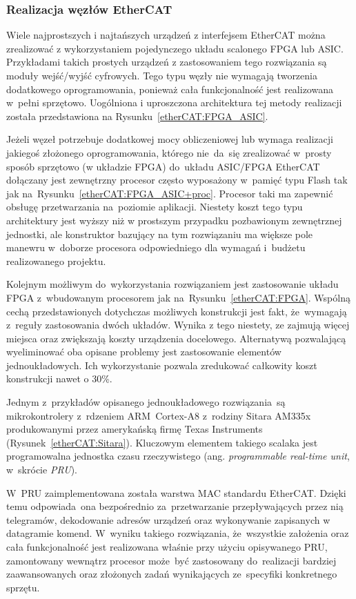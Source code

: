 \subsubsection{Realizacja węzłów EtherCAT}
Wiele najprostszych i najtańszych urządzeń z interfejsem EtherCAT można zrealizować z wykorzystaniem pojedynczego układu scalonego FPGA lub ASIC. Przykładami takich prostych urządzeń z zastosowaniem tego rozwiązania są moduły wejść/wyjść cyfrowych. Tego typu węzły nie wymagają tworzenia dodatkowego oprogramowania, ponieważ cała funkcjonalność jest realizowana w~pełni sprzętowo. Uogólniona i uproszczona architektura tej metody realizacji została przedstawiona na Rysunku~\ref{etherCAT:FPGA_ASIC}.

Jeżeli węzeł potrzebuje dodatkowej mocy obliczeniowej lub wymaga realizacji jakiegoś złożonego oprogramowania, którego nie~da~się zrealizować w~prosty sposób sprzętowo (w układzie FPGA) do~układu ASIC/FPGA EtherCAT dołączany jest zewnętrzny procesor często wyposażony w~pamięć typu Flash tak jak na~Rysunku~\ref{etherCAT:FPGA_ASIC+proc}. Procesor taki ma zapewnić obsługę przetwarzania na~poziomie aplikacji. Niestety koszt tego typu architektury jest wyższy niż w prostszym przypadku pozbawionym zewnętrznej jednostki, ale konstruktor bazujący na tym rozwiązaniu ma większe pole manewru w~doborze procesora odpowiedniego dla wymagań i~budżetu realizowanego projektu.

Kolejnym możliwym do~wykorzystania rozwiązaniem jest zastosowanie układu FPGA z~wbudowanym procesorem jak na~Rysunku~\ref{etherCAT:FPGA}. Wspólną cechą przedstawionych dotychczas możliwych konstrukcji jest fakt, że~wymagają z~reguły zastosowania dwóch układów. Wynika z tego niestety, ze zajmują więcej miejsca oraz zwiększają koszty urządzenia docelowego. Alternatywą pozwalającą wyeliminować oba opisane problemy jest zastosowanie elementów jednoukładowych. Ich wykorzystanie pozwala zredukować całkowity koszt konstrukcji nawet o 30\%.

Jednym z~przykładów opisanego jednoukładowego rozwiązania~są mikrokontrolery z~rdzeniem ARM~Cortex-A8 z~rodziny Sitara AM335x produkowanymi przez amerykańską firmę Texas Instruments (Rysunek~\ref{etherCAT:Sitara}). Kluczowym elementem takiego scalaka jest programowalna jednostka czasu rzeczywistego (ang. \textit{programmable real-time unit}, w~skrócie \textit{PRU}). 
\clearpage

W~PRU zaimplementowana została warstwa MAC standardu EtherCAT. Dzięki temu odpowiada~ona bezpośrednio za~przetwarzanie przepływających przez nią telegramów, dekodowanie adresów urządzeń oraz wykonywanie zapisanych w datagramie komend. W~wyniku takiego rozwiązania, że~wszystkie założenia oraz cała funkcjonalność jest realizowana właśnie przy użyciu opisywanego PRU, zamontowany wewnątrz procesor może~być zastosowany do~realizacji bardziej zaawansowanych oraz złożonych zadań wynikających ze~specyfiki konkretnego sprzętu.

